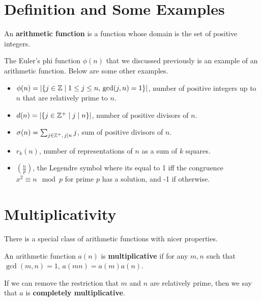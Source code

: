 \section{Definition and Some Examples}

\begin{definition}
    An \textbf{arithmetic function} is a function whose domain is the set of positive integers.
\end{definition}

The Euler's phi function $\phi(n)$ that we discussed previously is an example of an arithmetic function. Below are some other examples.

\begin{example}
    \hfill
    \begin{itemize}
        \item $\phi(n) = |\{j \in \mathbb{Z} \mid 1 \leq j \leq n,\, \gcd(j,n) = 1\}|$, number of positive integers up to $n$ that are relatively prime to $n$.
        \item $d(n) = |\{j \in \mathbb{Z}^+ \mid j \mathrel{\mid} n\}|$, number of positive divisors of $n$.
        \item $\sigma(n) = \sum_{j \in \mathbb{Z}^+,\, j \mathrel{\mid} n} j$, sum of positive divisors of $n$.
        \item $r_k(n)$, number of representations of $n$ as a sum of $k$ squares.
        \item $\left( \frac{n}{p} \right) $, the Legendre symbol where its equal to 1 iff the congruence $x^2 \equiv n \mod p$ for prime $p$ has a solution, and -1 if otherwise.
    \end{itemize}
\end{example}

\section{Multiplicativity}

There is a special class of arithmetic functions with nicer properties.

\begin{definition}
    An arithmetic function $a(n)$ is \textbf{multiplicative} if for any $m,n$ such that $\gcd(m,n) = 1$, $a(mn) = a(m)a(n)$.
\end{definition}

If we can remove the restriction that $m$ and $n$ are relatively prime, then we say that $a$ is \textbf{completely multiplicative}.

